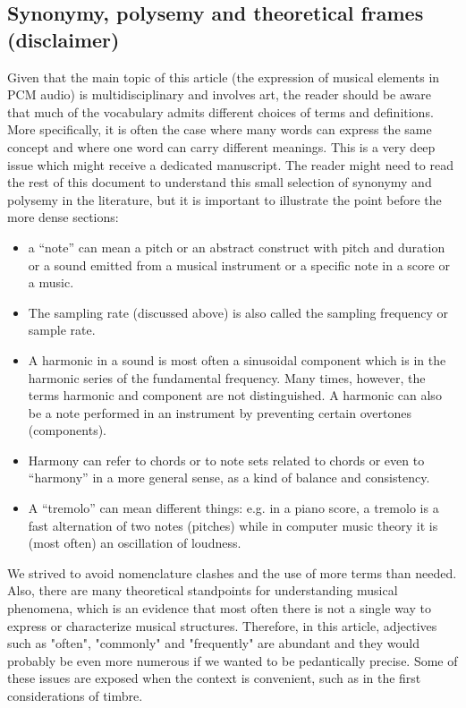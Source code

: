 \subsection{Synonymy, polysemy and theoretical frames (disclaimer)}\label{sec:disc}
Given that the main topic of this article (the expression of musical elements
in PCM audio) is multidisciplinary and involves art,
the reader should be aware that much of the vocabulary admits different choices of terms and definitions.
More specifically, it is often the case where many words can express the same concept
and where one word can carry different meanings.
This is a very deep issue which might receive a dedicated manuscript.
The reader might need to read the rest of this document to understand this
small selection of synonymy and polysemy in the literature,
but it is important to illustrate the point before the more dense sections:
\begin{itemize}
	\item a ``note'' can mean a pitch or an abstract construct with pitch and duration or a sound emitted from a musical instrument or a specific note in a score or a music.
	\item The sampling rate (discussed above) is also called the sampling frequency or sample rate.
	\item A harmonic in a sound is most often a sinusoidal component which is in the harmonic series of the fundamental frequency. Many times, however, the terms harmonic and component are not distinguished. A harmonic can also be a note performed in an instrument by preventing certain overtones (components).
	\item Harmony can refer to chords or to note sets related to chords or even to ``harmony'' in a more general sense, as a kind of balance and consistency.
	\item A ``tremolo'' can mean different things: e.g. in a piano score, a tremolo is a fast alternation of two notes (pitches) while in computer music theory it is (most often) an oscillation of loudness.
\end{itemize}

We strived to avoid nomenclature clashes and the use of more terms than needed.
Also, there are many theoretical standpoints for understanding musical phenomena,
which is an evidence that most often there is not a single way to express or characterize musical structures.
Therefore, in this article, adjectives such as "often", "commonly" and "frequently" are abundant and they would probably be even more numerous if we wanted to be pedantically precise.
Some of these issues are exposed when the context is convenient, such as in the first considerations of timbre.

